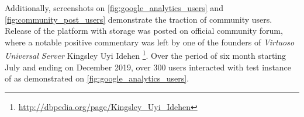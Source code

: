 Additionally, screenshots on \autoref{fig:google_analytics_users} and \autoref{fig:community_post_users} demonstrate the traction of \solid{} community users. Release of the \lpa{} platform with \lpas{} storage was posted on official \solid{} community forum, where a notable positive commentary was left by one of the founders of \textit{Virtuoso Universal Server} Kingsley Uyi Idehen \footnote{\url{http://dbpedia.org/page/Kingsley_Uyi_Idehen}}. Over the period of six month starting July and ending on December 2019, over 300 users interacted with test instance of \lpa{} as demonstrated on \autoref{fig:google_analytics_users}.
